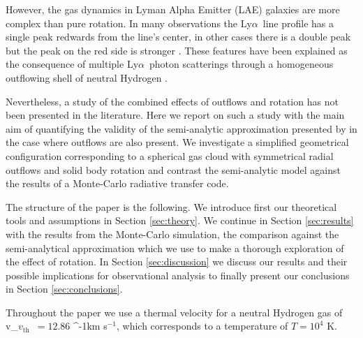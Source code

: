 \documentclass[a4paper,fleqn,usenatbib]{mnras}
\newcommand{\lya}{\ifmmode{{\rm Ly}\alpha}\else Ly$\alpha$\ \fi}
\newcommand{\kms}{\ifmmode\mathrm{km\ s}^{-1}\else km s$^{-1}$\fi}
\newcommand{\vth}{\ifmmode v_{\mathrm{th}}\else $v_{\mathrm{th}}$~\fi}
\begin{document}
However, the gas dynamics in Lyman Alpha Emitter (LAE) galaxies are
more complex than pure rotation.
In many observations the \lya line profile has a single peak
redwards from the line's center, in other cases there is a double peak
but the peak on the red side is stronger
\citep[e.g.][]{2010ApJ...717..289S,Erb14,Trainor16}.   
These features have been explained as the consequence of multiple
\lya photon scatterings through a homogeneous outflowing shell of
neutral Hydrogen
\citep{2006A&A...460..397V,Orsi12,2015ApJ...812..123G}.  

Nevertheless, a study of the combined effects of outflows and
rotation has not been presented in the literature.
Here we report on such a study with the main aim of quantifying the
validity of the semi-analytic approximation presented by
\cite{Garavito14} in the case where outflows are also present. 
We investigate a simplified geometrical configuration corresponding to a
spherical gas cloud with symmetrical radial outflows and solid body
rotation and contrast the semi-analytic model against the results of a
Monte-Carlo radiative transfer code. 

The structure of the paper is the following.
We introduce first our theoretical tools and assumptions
in Section \ref{sec:theory}. We continue in Section \ref{sec:results}
with the results from the Monte-Carlo simulation, the comparison
against the semi-analytical approximation which we use to make a
thorough exploration of the effect of rotation.
In Section \ref{sec:discussion} we discuss our results and their
possible implications for observational analysis to finally present
our conclusions in Section \ref{sec:conclusions}.

Throughout the paper we use a thermal velocity for a neutral Hydrogen
gas of \vth $= 12.86$ \kms, which corresponds to a temperature of
$T=10^4$ K. 
\end{document}
